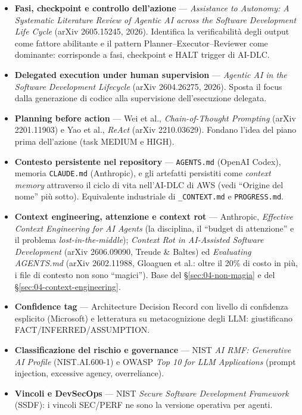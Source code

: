 \begin{itemize}
  \item \textbf{Fasi, checkpoint e controllo dell'azione} --- \textit{Assistance to Autonomy: A Systematic Literature Review of Agentic AI across the Software Development Life Cycle} (arXiv 2605.15245, 2026). Identifica la verificabilità degli output come fattore abilitante e il pattern Planner--Executor--Reviewer come dominante: corrisponde a fasi, checkpoint e HALT trigger di AI-DLC.
  \item \textbf{Delegated execution under human supervision} --- \textit{Agentic AI in the Software Development Lifecycle} (arXiv 2604.26275, 2026). Sposta il focus dalla generazione di codice alla supervisione dell'esecuzione delegata.
  \item \textbf{Planning before action} --- Wei et al., \textit{Chain-of-Thought Prompting} (arXiv 2201.11903) e Yao et al., \textit{ReAct} (arXiv 2210.03629). Fondano l'idea del piano prima dell'azione (task MEDIUM e HIGH).
  \item \textbf{Contesto persistente nel repository} --- \texttt{AGENTS.md} (OpenAI Codex), memoria \texttt{CLAUDE.md} (Anthropic), e gli artefatti persistiti come \textit{context memory} attraverso il ciclo di vita nell'AI-DLC di AWS (vedi ``Origine del nome'' più sotto). Equivalente industriale di \texttt{\_CONTEXT.md} e \texttt{PROGRESS.md}.
  \item \textbf{Context engineering, attenzione e context rot} --- Anthropic, \textit{Effective Context Engineering for AI Agents} (la disciplina, il ``budget di attenzione'' e il problema \textit{lost-in-the-middle}); \textit{Context Rot in AI-Assisted Software Development} (arXiv 2606.09090, Treude \& Baltes) ed \textit{Evaluating AGENTS.md} (arXiv 2602.11988, Gloaguen et al.: oltre il 20\% di costo in più, i file di contesto non sono ``magici''). Base del §\ref{sec:04-non-magia} e del §\ref{sec:04-context-engineering}.
  \item \textbf{Confidence tag} --- Architecture Decision Record con livello di confidenza esplicito (Microsoft) e letteratura su metacognizione degli LLM: giustificano FACT/INFERRED/ASSUMPTION.
  \item \textbf{Classificazione del rischio e governance} --- NIST \textit{AI RMF: Generative AI Profile} (NIST.AI.600-1) e OWASP \textit{Top 10 for LLM Applications} (prompt injection, excessive agency, overreliance).
  \item \textbf{Vincoli e DevSecOps} --- NIST \textit{Secure Software Development Framework} (SSDF): i vincoli SEC/PERF ne sono la versione operativa per agenti.

\end{itemize}
